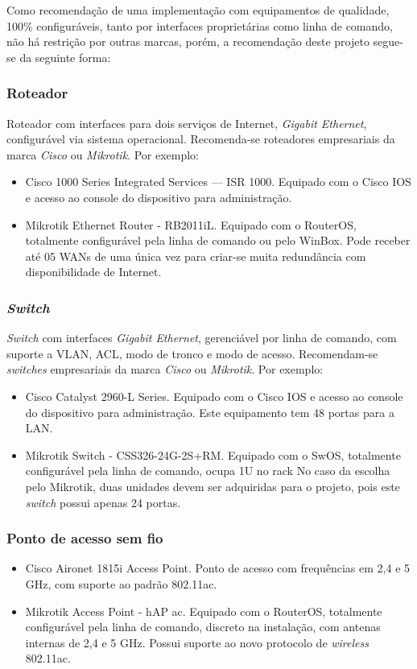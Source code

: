 \documentclass[	DIV=calc,%
							paper=a4,%
							fontsize=12pt,%
							onecolumn]{scrartcl}	 					%
\begin{document}
Como recomendação de uma implementação com equipamentos de qualidade, 100\% configuráveis, tanto por interfaces proprietárias como linha de comando, não há restrição por outras marcas, porém, a recomendação deste projeto segue-se da seguinte forma:

\subsubsection{Roteador}

Roteador com interfaces para dois serviços de Internet, \textit{Gigabit Ethernet}, configurável via sistema operacional. Recomenda-se roteadores empresariais da marca \textit{Cisco} ou \textit{Mikrotik}. Por exemplo:

\begin{itemize}
\item{Cisco 1000 Series Integrated Services --- ISR 1000}. Equipado com o Cisco IOS e acesso ao console do dispositivo para administração.
\item{Mikrotik Ethernet Router - RB2011iL}. Equipado com o RouterOS, totalmente configurável pela linha de comando ou pelo WinBox. Pode receber até 05 WANs de uma única vez para criar-se muita redundância com disponibilidade de Internet. 
\end{itemize}

\subsubsection{\textit{Switch}}

\textit{Switch} com interfaces \textit{Gigabit Ethernet}, gerenciável por linha de comando, com suporte a VLAN, ACL, modo de tronco e modo de acesso. Recomendam-se \textit{switches} empresariais da marca \textit{Cisco} ou \textit{Mikrotik}. Por exemplo:

\begin{itemize}
	\item{Cisco Catalyst 2960-L Series}. Equipado com o Cisco IOS e acesso ao console do dispositivo para administração. Este equipamento tem 48 portas para a LAN.
	\item{Mikrotik Switch - CSS326-24G-2S+RM}. Equipado com o SwOS, totalmente configurável pela linha de comando, ocupa 1U no rack No caso da escolha pelo Mikrotik, duas unidades devem ser adquiridas para o projeto, pois este \textit{switch} possui apenas 24 portas. 
\end{itemize}

\subsubsection{Ponto de acesso sem fio}
\begin{itemize}
	\item{Cisco Aironet 1815i Access Point}. Ponto de acesso com frequências em 2,4 e 5 GHz, com suporte ao padrão 802.11ac.
	\item{Mikrotik Access Point - hAP ac}. Equipado com o RouterOS, totalmente configurável pela linha de comando, discreto  na instalação, com antenas internas de 2,4 e 5 GHz. Possui suporte ao novo protocolo de \textit{wireless} 802.11ac.  
\end{itemize}
\end{document}
